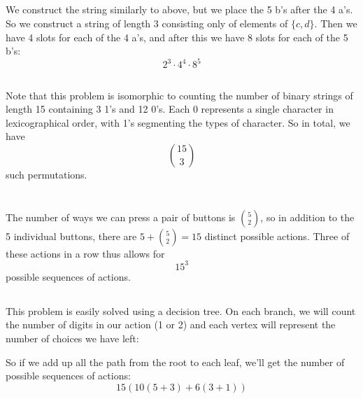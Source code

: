 \documentclass{article}
\begin{document}
\subsection{}
	We construct the string similarly to above, but we place the 5 b's after the 4 a's.
	So we construct a string of length 3 consisting only of elements of $\{c,d\}$.
	Then we have 4 slots for each of the 4 a's, and after this we have 8 slots for each
	of the 5 b's:
	\[2^3\cdot4^4\cdot8^5\]
\subsection{}
	Note that this problem is isomorphic to counting the number of binary strings of length
	15 containing 3 1's and 12 0's. Each 0 represents a single character in lexicographical
	order, with 1's segmenting the types of character. So in total, we have
	\[15\choose3\]
	such permutations.
\section{} %
\subsection{}
	The number of ways we can press a pair of buttons is $5\choose2$, so in addition to the
	5 individual buttons, there are $5+{5\choose2}=15$ distinct possible actions. Three of
	these actions in a row thus allows for
	\[15^3\]
	possible sequences of actions.
\subsection{}
	This problem is easily solved using a decision tree. On each branch, we will count the
	number of digits in our action (1 or 2) and each vertex will represent the number of
	choices we have left:
	\newline
	\newline
	\newline
	\newline
	So if we add up all the path from the root to each leaf, we'll get the number of possible
	sequences of actions:
	\[15(10(5+3)+6(3+1))\]
\end{document}

